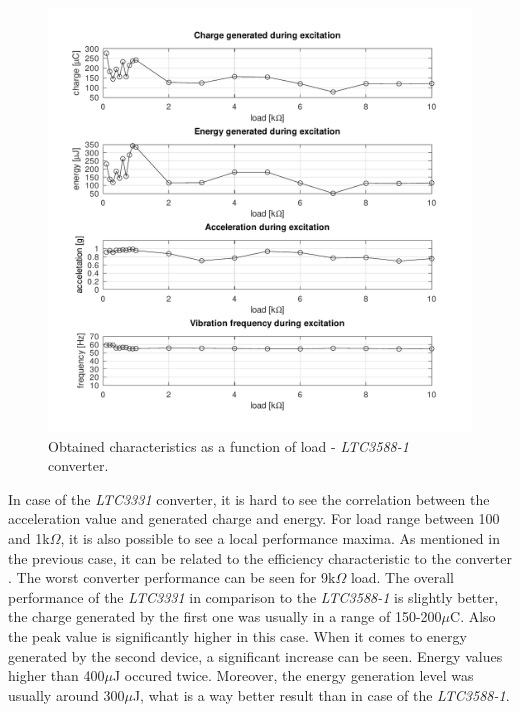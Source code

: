 \documentclass[12pt,a4paper]{article}
\begin{document}
\begin{figure}[ht!]
\includegraphics[scale=0.85]{results3588.pdf}
\caption{Obtained characteristics as a function of load - \textit{LTC3588-1} converter.}
\label{fig:results3588}
\end{figure}
\par
In case of the \textit{LTC3331} converter, it is hard to see the correlation between the acceleration value and generated charge and energy. For load range between 100 and 1k$\Omega$, it is also possible to see a local performance maxima. As mentioned in the previous case, it can be related to the efficiency characteristic to the converter \cite{ltc3331_params}. The worst converter performance can be seen for 9k$\Omega$ load. The overall performance of the \textit{LTC3331} in comparison to the \textit{LTC3588-1} is slightly better, the charge generated by the first one was usually in a range of 150-200$\mu$C. Also the peak value is significantly higher in this case. When it comes to energy generated by the second device, a significant increase can be seen. Energy values higher than 400$\mu$J occured twice. Moreover, the energy generation level was usually around 300$\mu$J, what is a way better result than in case of the \textit{LTC3588-1}.
\end{document}
